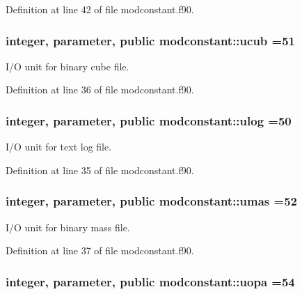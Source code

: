 Definition at line 42 of file modconstant.\-f90.

\hypertarget{classmodconstant_a9509aa964770163a2cc1dab767b7afc1}{
\subsubsection[{ucub}]{\setlength{\rightskip}{0pt plus 5cm}integer, parameter, public modconstant\-::ucub =51}}\label{classmodconstant_a9509aa964770163a2cc1dab767b7afc1}


I/\-O unit for binary cube file. 



Definition at line 36 of file modconstant.\-f90.

\hypertarget{classmodconstant_ae996968f053a2ed978bda16dad601b9f}{
\subsubsection[{ulog}]{\setlength{\rightskip}{0pt plus 5cm}integer, parameter, public modconstant\-::ulog =50}}\label{classmodconstant_ae996968f053a2ed978bda16dad601b9f}


I/\-O unit for text log file. 



Definition at line 35 of file modconstant.\-f90.

\hypertarget{classmodconstant_a7c4638477348db5b2b973ec77d289248}{
\subsubsection[{umas}]{\setlength{\rightskip}{0pt plus 5cm}integer, parameter, public modconstant\-::umas =52}}\label{classmodconstant_a7c4638477348db5b2b973ec77d289248}


I/\-O unit for binary mass file. 



Definition at line 37 of file modconstant.\-f90.

\hypertarget{classmodconstant_aa03af4caf7d57d16746ad4cb3c673677}{
\subsubsection[{uopa}]{\setlength{\rightskip}{0pt plus 5cm}integer, parameter, public modconstant\-::uopa =54}}\label{classmodconstant_aa03af4caf7d57d16746ad4cb3c673677}



